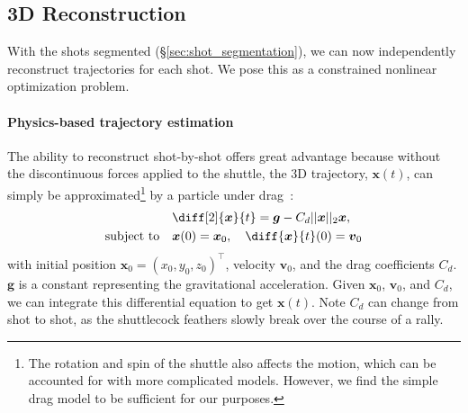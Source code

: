 \subsection{3D Reconstruction}
\label{sec:3d-recon}

With the shots segmented (\S\ref{sec:shot_segmentation}), we can now independently reconstruct trajectories for each shot. We pose this as a constrained nonlinear optimization problem.

\paragraph{Physics-based trajectory estimation} The ability to reconstruct shot-by-shot offers great advantage because without the discontinuous forces applied to the shuttle, the 3D trajectory, $\boldsymbol{x}(t)$, can simply be approximated\footnote{The rotation and spin of the shuttle also affects the motion, which can be accounted for with more complicated models. However, we find the simple drag model to be sufficient for our purposes.} by a particle under drag~\cite{cohen_physics_2015}:
\begin{align}
                       &\diff[2]{\boldsymbol{x}}{t} = \boldsymbol{g} - C_d ||\boldsymbol{x}||_2 \boldsymbol{x}, \\
\text{subject to}\quad & \boldsymbol{x}(0) = \boldsymbol{x}_0, \quad \diff{\boldsymbol{x}}{t}(0) = \boldsymbol{v}_0
\label{eq:drag}
\end{align}
with initial position $\boldsymbol{x}_0 = (x_0, y_0, z_0)^\intercal$, velocity $\boldsymbol{v}_0$, and the drag coefficients $C_d$. $\boldsymbol{g}$ is a constant representing the gravitational acceleration. Given $\boldsymbol{x}_0$, $\boldsymbol{v}_0$, and $C_d$, we can integrate this differential equation to get $\boldsymbol{x}(t)$. Note $C_d$ can change from shot to shot, as the shuttlecock feathers slowly break over the course of a rally. 

